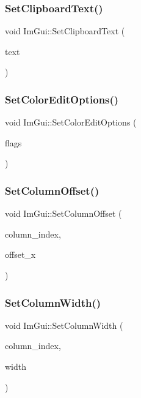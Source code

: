 \subsubsection{\texorpdfstring{Set\+Clipboard\+Text()}{SetClipboardText()}}
{\footnotesize\ttfamily void Im\+Gui\+::\+Set\+Clipboard\+Text (\begin{DoxyParamCaption}\item[{const char $\ast$}]{text }\end{DoxyParamCaption})}

\hypertarget{namespace_im_gui_ac768151f2ac6c7d79b31b934cc0e9d05}{}\label{namespace_im_gui_ac768151f2ac6c7d79b31b934cc0e9d05} 
\subsubsection{\texorpdfstring{Set\+Color\+Edit\+Options()}{SetColorEditOptions()}}
{\footnotesize\ttfamily void Im\+Gui\+::\+Set\+Color\+Edit\+Options (\begin{DoxyParamCaption}\item[{Im\+Gui\+Color\+Edit\+Flags}]{flags }\end{DoxyParamCaption})}

\hypertarget{namespace_im_gui_a8cc207211d6cf3f77b505e24aed4ebcc}{}\label{namespace_im_gui_a8cc207211d6cf3f77b505e24aed4ebcc} 
\subsubsection{\texorpdfstring{Set\+Column\+Offset()}{SetColumnOffset()}}
{\footnotesize\ttfamily void Im\+Gui\+::\+Set\+Column\+Offset (\begin{DoxyParamCaption}\item[{int}]{column\+\_\+index,  }\item[{float}]{offset\+\_\+x }\end{DoxyParamCaption})}

\hypertarget{namespace_im_gui_af17222ec47aebb5ede00be7b52de9f5d}{}\label{namespace_im_gui_af17222ec47aebb5ede00be7b52de9f5d} 
\subsubsection{\texorpdfstring{Set\+Column\+Width()}{SetColumnWidth()}}
{\footnotesize\ttfamily void Im\+Gui\+::\+Set\+Column\+Width (\begin{DoxyParamCaption}\item[{int}]{column\+\_\+index,  }\item[{float}]{width }\end{DoxyParamCaption})}

